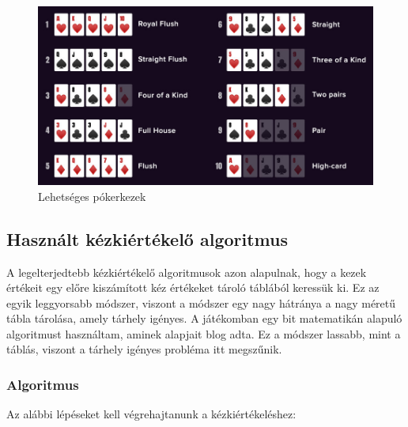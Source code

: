 \documentclass[]{thesis-ekf}
\theoremstyle{definition}
\theoremstyle{remark}
\begin{document}
\begin{figure}[ht!]
	\centering
	\includegraphics[width=14cm]{PokerHands}
	\caption{Lehetséges pókerkezek}
	\label{fig-pokerhands}
\end{figure}

\subsection{Használt kézkiértékelő algoritmus}
\label{subsec-kezkiertekeloalgoritmus}

A legelterjedtebb kézkiértékelő algoritmusok azon alapulnak, hogy a kezek értékeit egy előre kiszámított kéz értékeket tároló táblából keressük ki. Ez az egyik leggyorsabb módszer, viszont a módszer egy nagy hátránya a nagy méretű tábla tárolása, amely tárhely igényes. A játékomban egy bit matematikán alapuló algoritmust használtam, aminek alapjait  blog adta. Ez a módszer lassabb, mint a táblás, viszont a tárhely igényes probléma itt megszűnik.

\subsubsection{Algoritmus}

Az alábbi lépéseket kell végrehajtanunk a kézkiértékeléshez:
\end{document}
